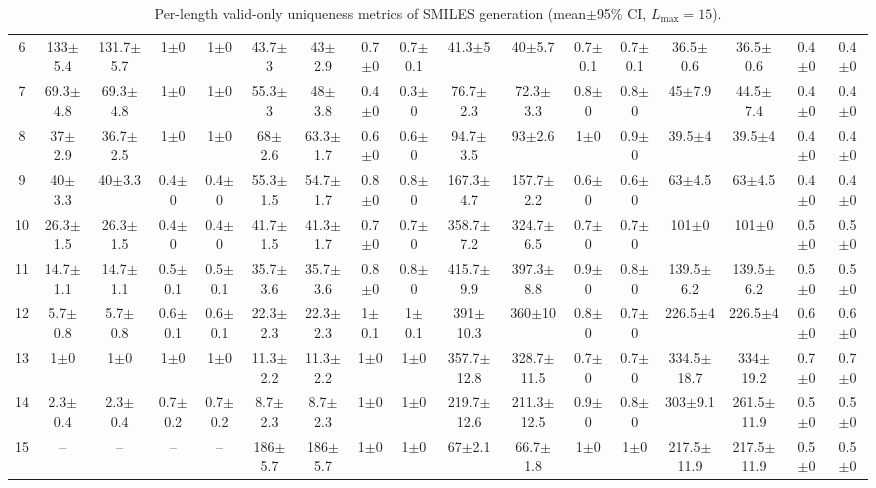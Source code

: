\documentclass{article}
\theoremstyle{plain}
\theoremstyle{definition}
\theoremstyle{remark}
\begin{document}
\begin{table}[!htbp]
{\begin{tabular}{ccccccccccccccccc}
6 & 133$\pm$5.4 & 131.7$\pm$5.7 & 1$\pm$0 & 1$\pm$0 & 43.7$\pm$3 & 43$\pm$2.9 & 0.7$\pm$0 & 0.7$\pm$0.1 & 41.3$\pm$5 & 40$\pm$5.7 & 0.7$\pm$0.1 & 0.7$\pm$0.1 & 36.5$\pm$0.6 & 36.5$\pm$0.6 & 0.4$\pm$0 & 0.4$\pm$0 \\
7 & 69.3$\pm$4.8 & 69.3$\pm$4.8 & 1$\pm$0 & 1$\pm$0 & 55.3$\pm$3 & 48$\pm$3.8 & 0.4$\pm$0 & 0.3$\pm$0 & 76.7$\pm$2.3 & 72.3$\pm$3.3 & 0.8$\pm$0 & 0.8$\pm$0 & 45$\pm$7.9 & 44.5$\pm$7.4 & 0.4$\pm$0 & 0.4$\pm$0 \\
8 & 37$\pm$2.9 & 36.7$\pm$2.5 & 1$\pm$0 & 1$\pm$0 & 68$\pm$2.6 & 63.3$\pm$1.7 & 0.6$\pm$0 & 0.6$\pm$0 & 94.7$\pm$3.5 & 93$\pm$2.6 & 1$\pm$0 & 0.9$\pm$0 & 39.5$\pm$4 & 39.5$\pm$4 & 0.4$\pm$0 & 0.4$\pm$0 \\
9 & 40$\pm$3.3 & 40$\pm$3.3 & 0.4$\pm$0 & 0.4$\pm$0 & 55.3$\pm$1.5 & 54.7$\pm$1.7 & 0.8$\pm$0 & 0.8$\pm$0 & 167.3$\pm$4.7 & 157.7$\pm$2.2 & 0.6$\pm$0 & 0.6$\pm$0 & 63$\pm$4.5 & 63$\pm$4.5 & 0.4$\pm$0 & 0.4$\pm$0 \\
10 & 26.3$\pm$1.5 & 26.3$\pm$1.5 & 0.4$\pm$0 & 0.4$\pm$0 & 41.7$\pm$1.5 & 41.3$\pm$1.7 & 0.7$\pm$0 & 0.7$\pm$0 & 358.7$\pm$7.2 & 324.7$\pm$6.5 & 0.7$\pm$0 & 0.7$\pm$0 & 101$\pm$0 & 101$\pm$0 & 0.5$\pm$0 & 0.5$\pm$0 \\
11 & 14.7$\pm$1.1 & 14.7$\pm$1.1 & 0.5$\pm$0.1 & 0.5$\pm$0.1 & 35.7$\pm$3.6 & 35.7$\pm$3.6 & 0.8$\pm$0 & 0.8$\pm$0 & 415.7$\pm$9.9 & 397.3$\pm$8.8 & 0.9$\pm$0 & 0.8$\pm$0 & 139.5$\pm$6.2 & 139.5$\pm$6.2 & 0.5$\pm$0 & 0.5$\pm$0 \\
12 & 5.7$\pm$0.8 & 5.7$\pm$0.8 & 0.6$\pm$0.1 & 0.6$\pm$0.1 & 22.3$\pm$2.3 & 22.3$\pm$2.3 & 1$\pm$0.1 & 1$\pm$0.1 & 391$\pm$10.3 & 360$\pm$10 & 0.8$\pm$0 & 0.7$\pm$0 & 226.5$\pm$4 & 226.5$\pm$4 & 0.6$\pm$0 & 0.6$\pm$0 \\
13 & 1$\pm$0 & 1$\pm$0 & 1$\pm$0 & 1$\pm$0 & 11.3$\pm$2.2 & 11.3$\pm$2.2 & 1$\pm$0 & 1$\pm$0 & 357.7$\pm$12.8 & 328.7$\pm$11.5 & 0.7$\pm$0 & 0.7$\pm$0 & 334.5$\pm$18.7 & 334$\pm$19.2 & 0.7$\pm$0 & 0.7$\pm$0 \\
14 & 2.3$\pm$0.4 & 2.3$\pm$0.4 & 0.7$\pm$0.2 & 0.7$\pm$0.2 & 8.7$\pm$2.3 & 8.7$\pm$2.3 & 1$\pm$0 & 1$\pm$0 & 219.7$\pm$12.6 & 211.3$\pm$12.5 & 0.9$\pm$0 & 0.8$\pm$0 & 303$\pm$9.1 & 261.5$\pm$11.9 & 0.5$\pm$0 & 0.5$\pm$0 \\
15 & -- & -- & -- & -- & 186$\pm$5.7 & 186$\pm$5.7 & 1$\pm$0 & 1$\pm$0 & 67$\pm$2.1 & 66.7$\pm$1.8 & 1$\pm$0 & 1$\pm$0 & 217.5$\pm$11.9 & 217.5$\pm$11.9 & 0.5$\pm$0 & 0.5$\pm$0 \\
\bottomrule
\end{tabular}
}%
\caption{Per-length valid-only uniqueness metrics of SMILES generation (mean$\pm$95\% CI, $L_{\max}=15$).}
\label{tab:smiles_L15_bylen_valid_uniq}
\end{table}
\end{document}
